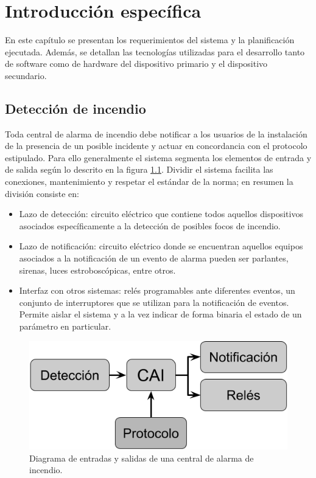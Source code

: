 \chapter{Introducción específica} %

\label{Chapter2}


En este capítulo se presentan los requerimientos del sistema y la planificación ejecutada. Además, se detallan las tecnologías utilizadas para el desarrollo tanto de software como de hardware del dispositivo primario y el dispositivo secundario.

\section{Detección de incendio}

Toda central de alarma de incendio debe notificar a los usuarios de la instalación de la presencia de un posible incidente y actuar en concordancia con el protocolo estipulado. Para ello generalmente el sistema segmenta los elementos de entrada y de salida según lo descrito en la figura \ref{fig:figura_a1}. Dividir el sistema facilita las conexiones, mantenimiento y respetar el estándar de la norma; en resumen la división consiste en: 

\begin{itemize}
\item  Lazo de detección: circuito eléctrico que contiene todos aquellos dispositivos asociados específicamente a la detección de posibles focos de incendio.
\item  Lazo de notificación: circuito eléctrico donde se encuentran aquellos equipos asociados a la notificación de un evento de alarma pueden ser parlantes, sirenas, luces estroboscópicas, entre otros.
\item  Interfaz con otros sistemas: relés programables ante diferentes eventos, un conjunto de interruptores que se utilizan para la notificación de eventos. Permite aislar el sistema y a la vez indicar de forma binaria el estado de un parámetro en particular.
\end{itemize}

\begin{figure}[h]
	\centering
	\includegraphics[scale=.45]{./Figures/Capitulo2/Figura_A.png}
	\caption{Diagrama de entradas y salidas de una central de alarma de incendio.}
	\label{fig:figura_a1}
\end{figure}

